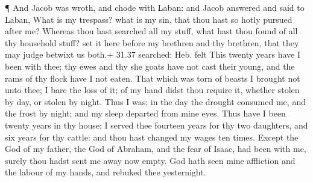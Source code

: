  ¶ And Jacob was wroth, and chode with Laban: and Jacob
answered and said to Laban, What is my trespass? what is my sin, that
thou hast so hotly pursued after me?  Whereas thou hast
searched all my stuff, what hast thou found of all thy household stuff?
set it here before my brethren and thy brethren, that they may judge
betwixt us both.+ 31.37 searched: Heb. felt  This twenty
years have I been with thee; thy ewes and thy she goats have not cast
their young, and the rams of thy flock have I not eaten. 
That which was torn of beasts I brought not unto thee; I bare the loss
of it; of my hand didst thou require it, whether stolen by day, or
stolen by night.  Thus I was; in the day the drought
consumed me, and the frost by night; and my sleep departed from mine
eyes.  Thus have I been twenty years in thy house; I served
thee fourteen years for thy two daughters, and six years for thy cattle:
and thou hast changed my wages ten times.  Except the God
of my father, the God of Abraham, and the fear of Isaac, had been with
me, surely thou hadst sent me away now empty. God hath seen mine
affliction and the labour of my hands, and rebuked thee yesternight.

